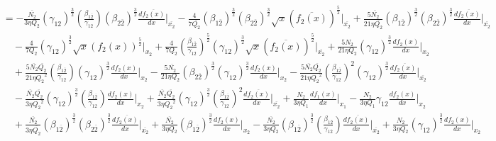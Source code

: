 \documentclass[fleqn, 10pt]{article}
\begin{document}
            \begin{equation*}
            \begin{split}
            &= -  \frac{\overline{N_2}}{3 \eta Q_2} (\gamma_{12})^\frac{3}{2} \left(\frac{\beta_{1\overline{2}}}{\gamma_{12}}\right) (\beta_{2\overline{2}})^\frac{3}{2} \frac{d\overline{f_2(x)}}{dx}\Bigg|_{\overline{x_2}} -   \frac{4}{7\overline{Q_2}} (\beta_{1\overline{2}})^\frac{3}{2} (\beta_{2\overline{2}})^\frac{3}{2} \sqrt{x} (\overline{f_2(x)})^\frac{5}{2} \Bigg|_{\overline{x_2}} + \frac{5 \overline{N_2}}{21 \eta \overline{ Q_2}} (\beta_{1\overline{2}})^\frac{3}{2} (\beta_{2\overline{2}})^\frac{3}{2} \frac{d\overline{f_2(x)}}{dx} \Bigg|_{\overline{x_2}} \\ & \quad -   \frac{4}{7 Q_2} (\gamma_{12})^\frac{3}{2} \sqrt{x} (f_2(x))^\frac{5}{2} \Bigg|_{x_2} +   \frac{4}{7 Q_2} \left(\frac{\beta_{1\overline{2}}}{\gamma_{12}}\right)^\frac{5}{2} (\gamma_{12})^\frac{3}{2} \sqrt{x} (\overline{f_2(x)})^\frac{5}{2} \Bigg|_{\overline{x_2}} +  \frac{5 N_2}{21 \eta Q_2} (\gamma_{12})^\frac{3}{2} \frac{df_2(x)}{dx}\Bigg|_{x_2} \\ & \quad +   \frac{5 \overline{N_2} \overline{Q_2}}{21 \eta {Q_2}^2} \left(\frac{\beta_{1\overline{2}}}{\gamma_{12}}\right) (\gamma_{12})^\frac{3}{2} \frac{df_2(x)}{dx} \Bigg|_{x_2}  -   \frac{5 \overline{N_2}}{21 \eta Q_2} (\beta_{2\overline{2}})^\frac{3}{2} (\gamma_{12})^\frac{3}{2} \frac{df_2(x)}{dx}\Bigg|_{x_2} -   \frac{5 \overline{N_2} \overline{Q_2}}{21 \eta {Q_2}^2}\left(\frac{\beta_{1\overline{2}}}{\gamma_{12}}\right)^2 (\gamma_{12})^\frac{3}{2} \frac{d\overline{f_2(x)}}{dx} \Bigg|_{\overline{x_2}}  \\ & \quad  -   \frac{\overline{N_2}\overline{Q_2}}{3 \eta {Q_2}^2} (\gamma_{12})^\frac{3}{2} \left(\frac{\beta_{1\overline{2}}}{\gamma_{12}}\right) \frac{df_2(x)}{dx} \Bigg|_{x_2}  +   \frac{\overline{N_2}\overline{Q_2}}{3 \eta {Q_2}^2} (\gamma_{12})^\frac{3}{2} \left(\frac{\beta_{1\overline{2}}}{\gamma_{12}}\right)^2 \frac{d\overline{f_2(x)}}{dx} \Bigg|_{\overline{x_2}} +   \frac{N_2}{3 \eta Q_1} \frac{df_1(x)}{dx} \Bigg|_{x_1} -  \frac{N_2}{3 \eta Q_1} \gamma_{12} \frac{df_2(x)}{dx} \Bigg|_{x_2} \\ & \quad +   \frac{\overline{N_2}}{3 \eta \overline{Q_2}} (\beta_{1\overline{2}})^\frac{3}{2} (\beta_{2\overline{2}})^\frac{3}{2} \frac{d\overline{f_2(x)}}{dx}\Bigg|_{\overline{x_2}}  +   \frac{\overline{N_2}}{3 \eta Q_2} (\beta_{1\overline{2}})^\frac{3}{2} \frac{df_2(x)}{dx}\Bigg|_{x_2} -   \frac{\overline{N_2}}{3 \eta Q_2} (\beta_{1\overline{2}})^\frac{3}{2} \left(\frac{\beta_{1\overline{2}}}{\gamma_{12}}\right) \frac{d\overline{f_2(x)}}{dx} \Bigg|_{\overline{x_2}}  +   \frac{N_2}{3 \eta Q_2} (\gamma_{12})^\frac{3}{2} \frac{df_2(x)}{dx} \Bigg|_{x_2}
            \end{split}
            \end{equation*}
\end{document}
